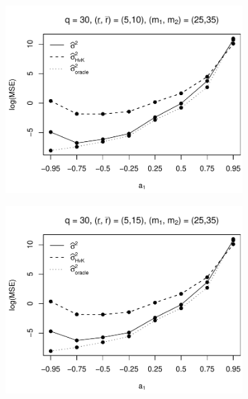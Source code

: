 \begin{figure}[p]
\begin{subfigure}[b]{0.45\textwidth}
\includegraphics[width=\textwidth]{Plots/Plots_Supplement/MSE_lrv_T=500_slope=10_(L1,L2,K1,K2,M1,M2)=(30,30,5,10,25,35).pdf}
\end{subfigure}
\hspace{0.25cm}
\begin{subfigure}[b]{0.45\textwidth}
\includegraphics[width=\textwidth]{Plots/Plots_Supplement/MSE_lrv_T=500_slope=10_(L1,L2,K1,K2,M1,M2)=(30,30,5,15,25,35).pdf}
\end{subfigure}


\end{figure}
